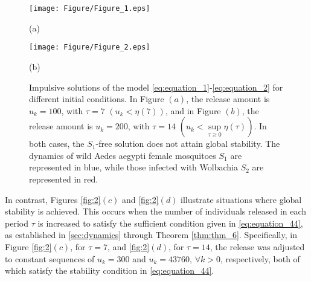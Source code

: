 \documentclass[10pt,letterpaper]{article}
\begin{document}
\begin{figure}[!ht]
    \centering
    \begin{minipage}{0.45\textwidth}
        \centering
        \texttt{[image: Figure/Figure\_1.eps]}
        \par\vspace{2pt} (a)
    \end{minipage}
    \hfill
    \begin{minipage}{0.45\textwidth}
        \centering
        \texttt{[image: Figure/Figure\_2.eps]}
        \par\vspace{2pt} (b)
    \end{minipage}
   \caption{Impulsive solutions of the model \eqref{eq:equation_1}-\eqref{eq:equation_2} for different initial conditions. In Figure $(a)$, the release amount is $u_k = 100$, with $\tau=7$ $(u_k<\eta(7))$, and in Figure $(b)$, the release amount is $u_k = 200$, with $\tau=14$ $\left(u_k<\sup\limits_{\tau \geq 0} \eta(\tau)\right)$. In both cases, the $S_1$-free solution does not attain global stability. The dynamics of wild Aedes aegypti female mosquitoes $S_1$ are represented in blue, while those infected with Wolbachia $S_2$ are represented in red.}

    \label{fig:1}
\end{figure}

In contrast, Figures \eqref{fig:2}$(c)$ and \eqref{fig:2}$(d)$ illustrate situations where global stability is achieved. This occurs when the number of individuals released in each period $\tau$ is increased to satisfy the sufficient condition given in \eqref{eq:equation_44}, as established in \eqref{sec:dynamics} through Theorem \eqref{thm:thm_6}. Specifically, in Figure \eqref{fig:2}$(c)$, for $\tau = 7$, and \eqref{fig:2}$(d)$, for $\tau = 14$, the release was adjusted to constant sequences of $u_k = 300$ and $u_k = 43760, \, \forall k > 0$, respectively, both of which satisfy the stability condition in \eqref{eq:equation_44}.
\end{document}
